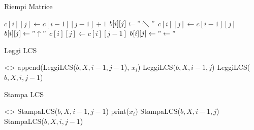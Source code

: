 \begin{algorithm}
    \renewcommand\thealgorithm{}
    \caption{Riempi Matrice}
    \begin{algorithmic}
                    \State $c[i][j] \gets c[i-1][j-1] + 1$
                    \State $b[i][j] \gets "\nwarrow"$
                \Else
                        \State $c[i][j] \gets c[i-1][j]$
                        \State $b[i][j] \gets "\uparrow"$
                    \Else
                        \State $c[i][j] \gets c[i][j-1]$
                        \State $b[i][j] \gets "\leftarrow"$
                    \EndIf
                \EndIf
            \EndFor
        \EndFor
        \EndProcedure
    \end{algorithmic}
\end{algorithm}

\begin{algorithm}
    \renewcommand\thealgorithm{}
    \caption{Leggi LCS}
    \begin{algorithmic}
                \State \Return <>
            \EndIf
                \State \Return append(LeggiLCS($b, X, i-1, j-1$), $x_{i}$)
            \Else
                    \State \Return LeggiLCS($b, X, i-1, j$)
                \Else
                    \State \Return LeggiLCS($b, X, i, j-1$)
                \EndIf
            \EndIf
        \EndProcedure
    \end{algorithmic}
\end{algorithm}

\begin{algorithm}
    \renewcommand\thealgorithm{}
    \caption{Stampa LCS}
    \begin{algorithmic}
                \State \Return <>
            \EndIf
                \State StampaLCS($b, X, i-1, j-1$)
                \State print($x_{i}$)
            \Else
                    \State StampaLCS($b, X, i-1, j$)
                \Else
                    \State StampaLCS($b, X, i, j-1$)
                \EndIf
            \EndIf
        \EndProcedure
    \end{algorithmic}
\end{algorithm}

